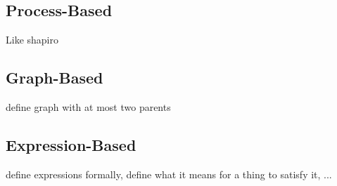 \section{\Iconfluence{}}

\subsection{Process-Based}
Like shapiro

\subsection{Graph-Based}
define graph with at most two parents

\subsection{Expression-Based}
define expressions formally, define what it means for a thing to satisfy it, ...


